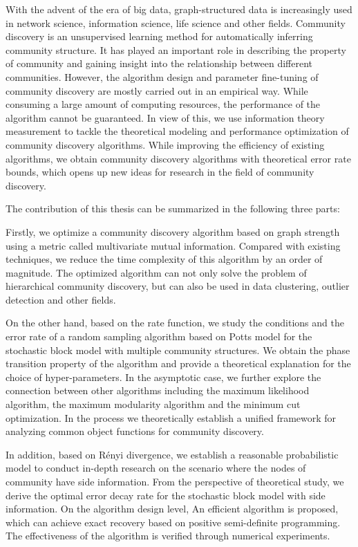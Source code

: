 \begin{abstract*}
  With the advent of the era of big data, graph-structured data is increasingly used in
  network science, information science, life science and other fields.
  Community discovery is an unsupervised learning method for automatically inferring community structure.
  It has played an important role in describing the property of community and gaining insight into the relationship between different communities.
  However, the algorithm design and parameter fine-tuning of community discovery are mostly carried out in an empirical way.
  While consuming a large amount of computing resources,
  the performance of the algorithm cannot be guaranteed.
  In view of this,
  we use information theory measurement to tackle the theoretical modeling and performance optimization of community discovery algorithms.
  While improving the efficiency of existing algorithms, we obtain community discovery algorithms with theoretical error rate bounds,
  which opens up new ideas for research in the field of community discovery.

  The contribution of this thesis can be summarized in the following three parts:

  Firstly, we optimize a community discovery algorithm based on graph strength using a metric called multivariate mutual information.
  Compared with existing techniques, we reduce the time complexity of this algorithm by an order of magnitude.
  The optimized algorithm can not only solve the problem of hierarchical community discovery, but can also be used in data clustering, outlier detection and other fields.

  On the other hand, based on the rate function,
  we study the conditions and the error rate of a random sampling algorithm based on Potts model
  for the stochastic block model with multiple community structures.
  We obtain the phase transition property of the algorithm and provide a theoretical explanation
  for the choice of hyper-parameters.
  In the asymptotic case, we further explore the connection between other algorithms including the maximum likelihood algorithm, the maximum modularity algorithm and the minimum cut optimization.
  In the process we theoretically establish a unified framework for analyzing common object functions for community discovery.

  In addition, based on Rényi divergence,
  we establish a reasonable probabilistic model
  to conduct in-depth research on the scenario
  where the nodes of community have side information.
  From the perspective of theoretical study,
  we derive the optimal error decay rate for the stochastic block model with side information.
  On the algorithm design level,
  An efficient algorithm is proposed, which can achieve exact recovery based on positive semi-definite programming.
  The effectiveness of the algorithm is verified through numerical experiments.


\end{abstract*}
